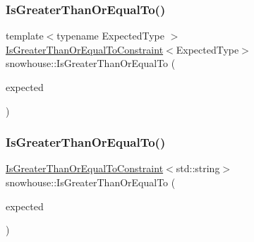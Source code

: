 \mbox{\label{namespacesnowhouse_a6a0accf040dae78744a15f7289b78fb1}} 
\subsubsection{\texorpdfstring{IsGreaterThanOrEqualTo()}{IsGreaterThanOrEqualTo()}\hspace{0.1cm}{\footnotesize\ttfamily [1/2]}}
{\footnotesize\ttfamily template$<$typename Expected\+Type $>$ \\
\mbox{\hyperlink{structsnowhouse_1_1IsGreaterThanOrEqualToConstraint}{Is\+Greater\+Than\+Or\+Equal\+To\+Constraint}}$<$Expected\+Type$>$ snowhouse\+::\+Is\+Greater\+Than\+Or\+Equal\+To (\begin{DoxyParamCaption}\item[{const Expected\+Type \&}]{expected }\end{DoxyParamCaption})\hspace{0.3cm}{\ttfamily [inline]}}

\mbox{\label{namespacesnowhouse_a48bf11962bead2223eb70819f7ce495b}} 
\subsubsection{\texorpdfstring{IsGreaterThanOrEqualTo()}{IsGreaterThanOrEqualTo()}\hspace{0.1cm}{\footnotesize\ttfamily [2/2]}}
{\footnotesize\ttfamily \mbox{\hyperlink{structsnowhouse_1_1IsGreaterThanOrEqualToConstraint}{Is\+Greater\+Than\+Or\+Equal\+To\+Constraint}}$<$std\+::string$>$ snowhouse\+::\+Is\+Greater\+Than\+Or\+Equal\+To (\begin{DoxyParamCaption}\item[{const char $\ast$}]{expected }\end{DoxyParamCaption})\hspace{0.3cm}{\ttfamily [inline]}}

\mbox{\label{namespacesnowhouse_a51cc77a599d046da4f1129abae92cd1f}} 
